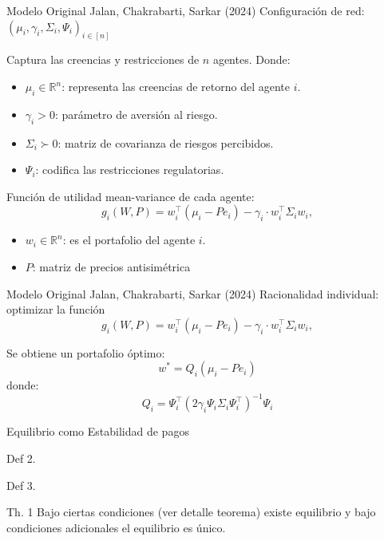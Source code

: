 \documentclass{beamer}
\begin{document}
\begin{frame}{Modelo Original Jalan, Chakrabarti, Sarkar (2024)}
Configuración de red: $(\mu_i, \gamma_i, \Sigma_i, \Psi_i)_{i \in [n]}$ 

Captura las creencias y restricciones de $n$ agentes.
Donde:
\begin{itemize}
\item $\mu_i \in \mathbb{R}^n$: representa las creencias de retorno del agente $i$.
\item $\gamma_i > 0$: parámetro de aversión al riesgo.
\item $\Sigma_i \succ 0$: matriz de covarianza de riesgos percibidos.
\item $\Psi_i$: codifica las restricciones regulatorias.
\end{itemize}

Función de utilidad mean-variance de cada agente:
\begin{equation}
g_i(W,P) = w_i^\top (\mu_i - P e_i) - \gamma_i \cdot w_i^\top \Sigma_i w_i,
\label{eq:utility_original}
\end{equation}
\begin{itemize}
\item $ w_i \in \mathbb{R}^n$: es el portafolio del agente $i$.
\item $P$: matriz de precios antisimétrica
\end{itemize}
\end{frame}

\begin{frame}{Modelo Original Jalan, Chakrabarti, Sarkar (2024)}
Racionalidad individual: optimizar la función
\begin{equation}
g_i(W,P) = w_i^\top (\mu_i - P e_i) - \gamma_i \cdot w_i^\top \Sigma_i w_i,
\label{eq:utility_original}
\end{equation}


Se obtiene un portafolio óptimo:
$$w^*=Q_i(\mu_i - Pe_i)$$
donde:
$$Q_i=\Psi_i ^\top(2\gamma_i\Psi_i\Sigma_i\Psi_i^\top)^{-1}\Psi_i $$
\end{frame}

\begin{frame}{Equilibrio como Estabilidad de pagos}

Def 2.

Def 3.

Th. 1 Bajo ciertas condiciones (ver detalle teorema) existe equilibrio y bajo condiciones adicionales el equilibrio es único.


\end{frame}
\end{document}
